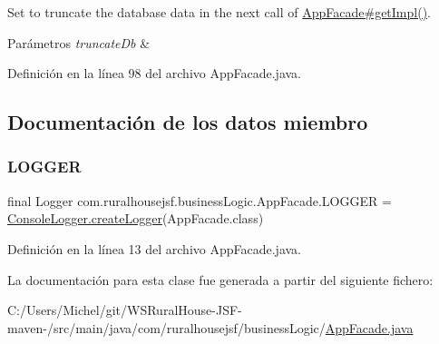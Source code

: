 Set to truncate the database data in the next call of \mbox{\hyperlink{classcom_1_1ruralhousejsf_1_1business_logic_1_1_app_facade_a029bcceee98b9070b9f80abc54db45d6}{App\+Facade\#get\+Impl()}}.


\begin{DoxyParams}{Parámetros}
{\em truncate\+Db} & \\
\hline
\end{DoxyParams}


Definición en la línea 98 del archivo App\+Facade.\+java.



\subsection{Documentación de los datos miembro}
\mbox{\label{classcom_1_1ruralhousejsf_1_1business_logic_1_1_app_facade_a05d4beab693581eccd0ba740dc222f37}} 
\subsubsection{\texorpdfstring{LOGGER}{LOGGER}}
{\footnotesize\ttfamily final Logger com.\+ruralhousejsf.\+business\+Logic.\+App\+Facade.\+L\+O\+G\+G\+ER = \mbox{\hyperlink{classcom_1_1ruralhousejsf_1_1logger_1_1_console_logger_a520321643663e37d95761134a35505cd}{Console\+Logger.\+create\+Logger}}(App\+Facade.\+class)\hspace{0.3cm}{\ttfamily [static]}}



Definición en la línea 13 del archivo App\+Facade.\+java.



La documentación para esta clase fue generada a partir del siguiente fichero\+:\begin{DoxyCompactItemize}
\item 
C\+:/\+Users/\+Michel/git/\+W\+S\+Rural\+House-\/\+J\+S\+F-\/maven-\//src/main/java/com/ruralhousejsf/business\+Logic/\mbox{\hyperlink{_app_facade_8java}{App\+Facade.\+java}}\end{DoxyCompactItemize}

